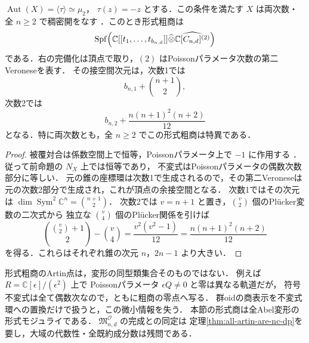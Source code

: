 \begin{corollary}[被覆対合だけを持つ点の形式粗商]
\label{cor:generic-nc-formal-sign-quotient}
$\operatorname{Aut}(X)=\langle\tau\rangle\simeq\mu_2$，
$\tau(z)=-z$ とする．この条件を満たす $X$ は両次数・全 $n\ge2$ で稠密開をなす
\cite[命題9.4]{PoissonDP}．このとき形式粗商は
\[
 \operatorname{Spf}\Bigl(
 \mathbb C[[t_1,\ldots,t_{b_{n,d}}]]
 \widehat\otimes\widehat{\mathbb C[C_{n,d}]^{(2)}}\Bigr)
\]
である．右の完備化は頂点で取り，$(2)$ はPoissonパラメータ次数の第二Veroneseを表す．
その接空間次元は，次数1では
\[
 b_{n,1}+\binom{n+1}{2},
\]
次数2では
\[
 b_{n,2}+\frac{n(n+1)^2(n+2)}{12}
\]
となる．特に両次数とも，全 $n\ge2$ でこの形式粗商は特異である．
\end{corollary}
\begin{proof}
被覆対合は係数空間上で恒等，Poissonパラメータ上で $-1$ に作用する
\cite[注意8.5]{PoissonDP}．従って前命題の $N_X$ 上では恒等であり，
不変式はPoissonパラメータの偶数次数部分に等しい．
元の錐の座標環は次数1で生成されるので，その第二Veroneseは
元の次数2部分で生成され，これが頂点の余接空間となる．
次数1ではその次元は $\dim\operatorname{Sym}^2\mathbb C^n=\binom{n+1}{2}$．
次数2では $v=n+1$ と置き，$\binom v2$ 個のPl\"ucker変数の二次式から
独立な $\binom v4$ 個のPl\"ucker関係を引けば
\[
 \binom{\binom v2+1}{2}-\binom v4
 =\frac{v^2(v^2-1)}{12}
 =\frac{n(n+1)^2(n+2)}{12}
\]
を得る．これらはそれぞれ錐の次元 $n$，$2n-1$ より大きい．
\end{proof}

\begin{remark}[粗商のArtin点と変形の同型類]
形式粗商のArtin点は，変形の同型類集合そのものではない．
例えば $R=\mathbb C[\epsilon]/(\epsilon^2)$ 上で
Poissonパラメータ $\epsilon Q\ne0$ と零は異なる軌道だが，
符号不変式は全て偶数次なので，ともに粗商の零点へ写る．
群oidの商表示を不変式環への置換だけで扱うと，この微小情報を失う．
本節の形式商は全Abel変形の形式モジュライである．
$\mathfrak M^{\mathcal O}_{n,d}$ の完成との同定は
定理\ref{thm:all-artin-are-nc-dp}を要し，大域の代数性・全既約成分数は残問である．
\end{remark}
